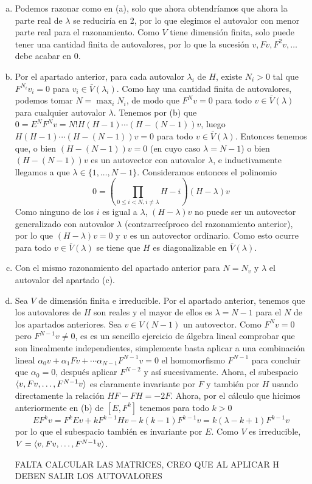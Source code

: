\documentclass[twoside]{article}
\begin{document}
\begin{solucion}
\begin{enumerate}[(a)]
\item Podemos razonar como en (a), solo que ahora obtendríamos que ahora la parte real de $\lambda$ se reduciría en 2, por lo que elegimos el autovalor con menor parte real para el razonamiento. Como $V$ tiene dimensión finita, solo puede tener una cantidad finita de autovalores, por lo que la sucesión $v,Fv,F^2v,\dots$ debe acabar en 0. 

\item Por el apartado anterior, para cada autovalor $\lambda_i$ de $H$, existe $N_i>0$ tal que $F^{N_i}v_i=0$ para $v_i\in\bar{V}(\lambda_i)$. Como hay una cantidad finita de autovalores, podemos tomar $N=\max_i N_i$, de modo que $F^Nv=0$ para todo $v\in\bar{V}(\lambda)$ para cualquier autovalor $\lambda$. Tenemos por (b) que $0=E^NF^Nv=N! H(H-1)\cdots (H-(N-1))v$, luego $H(H-1)\cdots (H-(N-1))v=0$ para todo $v\in\bar{V}(\lambda)$. Entonces tenemos que, o bien $(H-(N-1))v=0$ (en cuyo caso $\lambda=N-1$) o bien $(H-(N-1))v$ es un autovector con autovalor $\lambda$, e inductivamente llegamos a que $\lambda\in\{1,\dots, N-1\}$. Consideramos entonces el polinomio
\[
0 = \left(\prod_{0 \leq i < N, i \neq \lambda} H-i\right) (H-\lambda)v
\]
Como ninguno de los $i$ es igual a $\lambda$, $(H-\lambda)v$ no puede ser un autovector generalizado con autovalor $\lambda$ (contrarrecíproco del razonamiento anterior), por lo que $(H-\lambda)v=0$ y $v$ es un autovector ordinario. Como esto ocurre para todo $v\in\bar{V}(\lambda)$ se tiene que $H$ es diagonalizable en $\bar{V}(\lambda)$. 

\item Con el mismo razonamiento del apartado anterior para $N=N_v$ y $\lambda$ el autovalor del apartado (c). 

\item Sea $V$ de dimensión finita e irreducible. Por el apartado anterior, tenemos que los autovalores de $H$ son reales y el mayor de ellos es $\lambda=N-1$ para el $N$ de los apartados anteriores. Sea $v\in V(N-1)$ un autovector. Como $F^Nv=0$ pero $F^{N-1}v\neq 0$, es es un sencillo ejercicio de álgebra lineal comprobar que son linealmente independientes, simplemente basta aplicar a una combinación lineal $\alpha_0v+\alpha_1Fv+\cdots \alpha_{N-1}F^{N-1}v=0$ el homomorfismo $F^{N-1}$ para concluir que $\alpha_0=0$, después aplicar $F^{N-2}$ y así sucesivamente. Ahora, el subespacio $\langle{v, Fv,\dots, F^{N-1}v}\rangle$ es claramente invariante por $F$ y también por $H$ usando directamente la relación $HF-FH=-2F$. Ahora, por el cálculo que hicimos anteriormente en (b) de $[E,F^k]$ tenemos para todo $k>0$
\[
EF^k v = F^k Ev + kF^{k-1}Hv -k(k-1)F^{k-1}v = k(\lambda-k+1) F^{k-1}v
\]
por lo que el subespacio también es invariante por $E$. Como $V$ es irreducible, $V=\langle{v, Fv,\dots, F^{N-1}v}\rangle$.

FALTA CALCULAR LAS MATRICES, CREO QUE AL APLICAR H DEBEN SALIR LOS AUTOVALORES
\end{enumerate}
\end{solucion}
\end{document}
